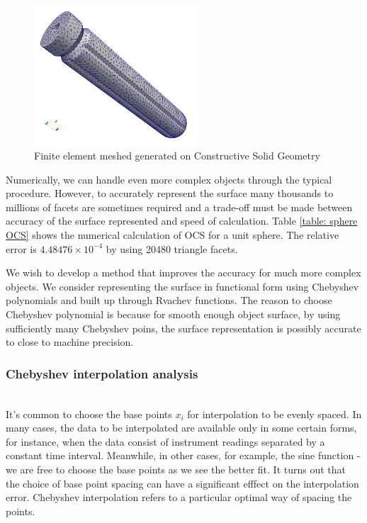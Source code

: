 \documentclass[11pt]{amsart}
\theoremstyle{definition}
\begin{document}
\begin{figure}     	\centerline{\includegraphics[width=2.4in]{./figs/sdh_mesh}}
     	\hspace{-6pt}
		\caption{Finite element meshed generated on Constructive Solid Geometry}
        \label{fig:sdh_mesh}
\end{figure}

Numerically, we can handle even more complex objects through the typical procedure. However, to accurately represent the surface many thousands to millions of facets are sometimes required and a trade-off must be made between accuracy of the surface represented and speed of calculation. Table \ref{table: sphere OCS} shows the numerical calculation of OCS for a unit sphere. The relative error is $4.48476\times 10^{-4}$ by using 20480 triangle facets.  

We wish to develop a method that improves the accuracy for much more complex objects. We consider representing the surface in functional form using Chebyshev polynomials and built up through Rvachev functions. The reason to choose Chebyshev polynomial is because for smooth enough object surface, by using sufficiently many Chebyshev poins, the surface representation is possibly accurate to close to machine precision.

\subsubsection{Chebyshev interpolation analysis}~\\
It's common to choose the base points $x_i$ for interpolation to be evenly spaced. In many cases, the data to be interpolated are available only in some certain forms, for instance, when the data consist of instrument readings separated by a constant time interval. Meanwhile, in other cases, for example, the sine function - we are free to choose the base points as we see the better fit. It turns out that the choice of base point spacing can have a significant efffect on the interpolation error. Chebyshev interpolation refers to a particular optimal way of spacing the points.
\end{document}
